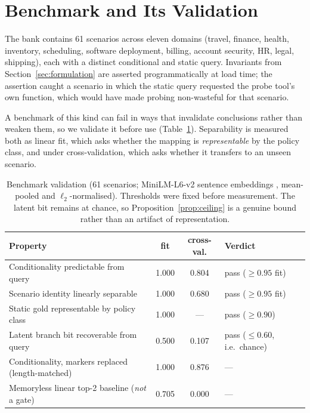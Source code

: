\documentclass[11pt]{article}
\begin{document}
\section{Benchmark and Its Validation}
\label{sec:bank}

The bank contains 61 scenarios across eleven domains (travel, finance, health,
inventory, scheduling, software deployment, billing, account security, HR, legal,
shipping), each with a distinct conditional and static query. Invariants from
Section~\ref{sec:formulation} are asserted programmatically at load time; the
assertion caught a scenario in which the static query requested the probe tool's
own function, which would have made probing non-wasteful for that scenario.

A benchmark of this kind can fail in ways that invalidate conclusions rather than
weaken them, so we validate it before use (Table~\ref{tab:bank}). Separability is
measured both as linear fit, which asks whether the mapping is \emph{representable}
by the policy class, and under cross-validation, which asks whether it transfers to
an unseen scenario.

\begin{table}[t]
\centering
\caption{Benchmark validation (61 scenarios; MiniLM-L6-v2 sentence embeddings
\citep{reimers2019sbert}, mean-pooled and $\ell_2$-normalised). Thresholds were fixed before measurement.
The latent bit remains at chance, so Proposition~\ref{prop:ceiling} is a genuine
bound rather than an artifact of representation.}
\label{tab:bank}
\begin{tabular}{lccl}
\toprule
Property & fit & cross-val. & Verdict \\
\midrule
Conditionality predictable from query  & 1.000 & 0.804 & pass ($\geq 0.95$ fit) \\
Scenario identity linearly separable   & 1.000 & 0.680 & pass ($\geq 0.95$ fit) \\
Static gold representable by policy class & 1.000 & --- & pass ($\geq 0.90$) \\
Latent branch bit recoverable from query & 0.500 & 0.107 & pass ($\leq 0.60$, i.e.\ chance) \\
\midrule
Conditionality, markers replaced (length-matched) & 1.000 & 0.876 & --- \\
Memoryless linear top-2 baseline (\emph{not} a gate) & 0.705 & 0.000 & --- \\
\bottomrule
\end{tabular}
\end{table}
\end{document}

